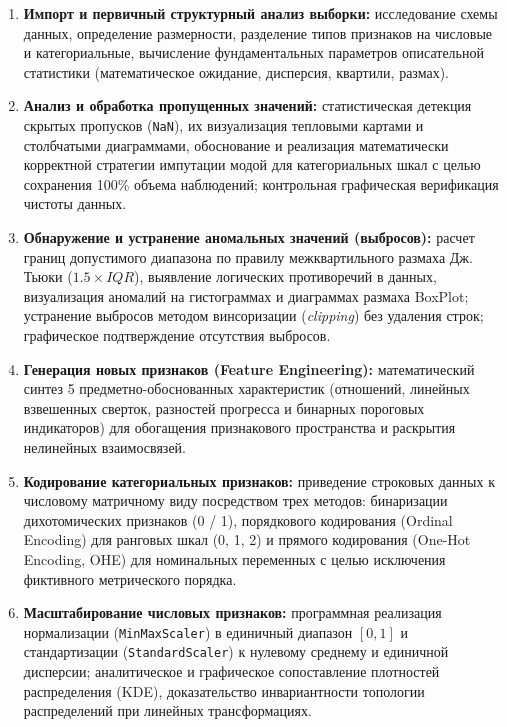 \documentclass[14pt,a4paper]{extarticle}
\begin{document}
\begin{enumerate}
    \item \textbf{Импорт и первичный структурный анализ выборки:} исследование схемы данных, определение размерности, разделение типов признаков на числовые и категориальные, вычисление фундаментальных параметров описательной статистики (математическое ожидание, дисперсия, квартили, размах).
    \item \textbf{Анализ и обработка пропущенных значений:} статистическая детекция скрытых пропусков (\texttt{NaN}), их визуализация тепловыми картами и столбчатыми диаграммами, обоснование и реализация математически корректной стратегии импутации модой для категориальных шкал с целью сохранения 100\% объема наблюдений; контрольная графическая верификация чистоты данных.
    \item \textbf{Обнаружение и устранение аномальных значений (выбросов):} расчет границ допустимого диапазона по правилу межквартильного размаха Дж. Тьюки ($1.5 \times IQR$), выявление логических противоречий в данных, визуализация аномалий на гистограммах и диаграммах размаха BoxPlot; устранение выбросов методом винсоризации (\textit{clipping}) без удаления строк; графическое подтверждение отсутствия выбросов.
    \item \textbf{Генерация новых признаков (Feature Engineering):} математический синтез 5 предметно-обоснованных характеристик (отношений, линейных взвешенных сверток, разностей прогресса и бинарных пороговых индикаторов) для обогащения признакового пространства и раскрытия нелинейных взаимосвязей.
    \item \textbf{Кодирование категориальных признаков:} приведение строковых данных к числовому матричному виду посредством трех методов: бинаризации дихотомических признаков (0 / 1), порядкового кодирования (Ordinal Encoding) для ранговых шкал (0, 1, 2) и прямого кодирования (One-Hot Encoding, OHE) для номинальных переменных с целью исключения фиктивного метрического порядка.
    \item \textbf{Масштабирование числовых признаков:} программная реализация нормализации (\texttt{MinMaxScaler}) в единичный диапазон $[0, 1]$ и стандартизации (\texttt{StandardScaler}) к нулевому среднему и единичной дисперсии; аналитическое и графическое сопоставление плотностей распределения (KDE), доказательство инвариантности топологии распределений при линейных трансформациях.
\end{enumerate}

\clearpage
\end{document}
